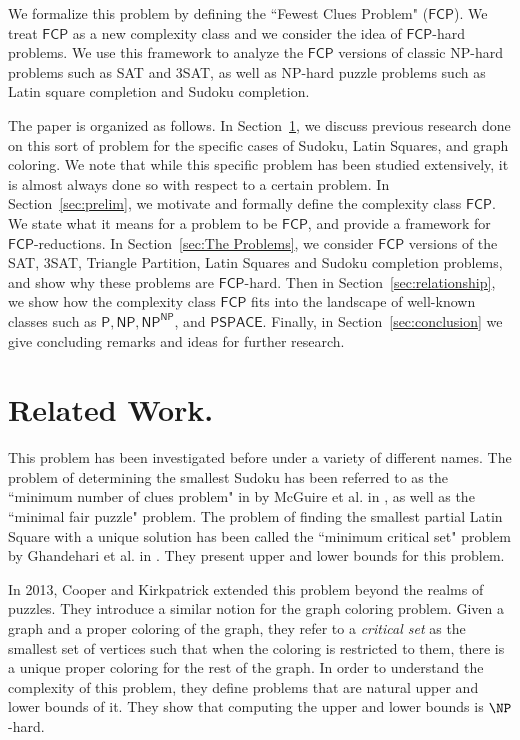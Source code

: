 \documentclass[runningheads,a4paper]{llncs}
\begin{document}
We formalize this problem by defining the ``Fewest Clues Problem" ($\mathsf{FCP}$). We treat $\mathsf{FCP}$ as a new complexity class and we consider the idea of $\mathsf{FCP}$-hard problems. We use this framework to analyze the $\mathsf{FCP}$ versions of classic NP-hard problems such as SAT and 3SAT, as well as NP-hard puzzle problems such as Latin square completion and Sudoku completion. 

The paper is organized as follows. In Section~\ref{sec:related}, we discuss previous research done on this sort of problem for the specific cases of Sudoku, Latin Squares, and graph coloring. We note that while this specific problem has been studied extensively, it is almost always done so with respect to a certain problem. In Section~\ref{sec:prelim}, we motivate and formally define the complexity class $\mathsf{FCP}$. We state what it means for a problem to be $\mathsf{FCP}$, and provide a framework for $\mathsf{FCP}$-reductions. In Section~\ref{sec:The Problems}, we consider $\mathsf{FCP}$ versions of the SAT, 3SAT, Triangle Partition, Latin Squares and Sudoku completion problems, and show why these problems are $\mathsf{FCP}$-hard. Then in Section~\ref{sec:relationship}, we show how the complexity class $\mathsf{FCP}$ fits into the landscape of well-known classes such as $\mathsf{P}, \mathsf{NP}, \mathsf{NP}^\mathsf{NP}$, and $\mathsf{PSPACE}$. Finally, in Section~\ref{sec:conclusion} we give concluding remarks and ideas for further research.


\section{Related Work.}
\label{sec:related}

This problem has been investigated before under a variety of different names. The problem of determining the smallest Sudoku has been referred to as the ``minimum number of clues problem" in
by McGuire et al. in \cite{mcguire2012there}, as well as the ``minimal fair puzzle" problem. The problem of finding the smallest partial Latin Square with a unique solution has been called the ``minimum critical set" problem by Ghandehari et al. in \cite{Ghandehari2005121}. They present upper and lower bounds for this problem. 

In 2013, Cooper and Kirkpatrick \cite{Cooper:2014:CSS:2612293.2612628} extended this problem beyond the realms of puzzles. They introduce a similar notion for the graph coloring problem. Given a graph and a proper coloring of the graph, they refer to a \emph{critical set} as the smallest set of vertices such that when the coloring is restricted to them, there is a unique proper coloring for the rest of the graph. In order to understand the complexity of this problem, they define problems that are natural upper and lower bounds of it. They show that computing the upper and lower bounds is $\NP$-hard. 
\end{document}
